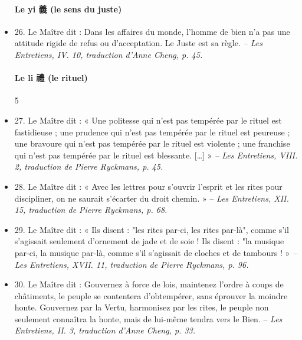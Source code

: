 \begin{itemize}
\paragraph{Le yi 義 (le sens du juste)}  
\item 26. \newline Le Maître dit : Dans les affaires du monde, l’homme de bien n’a pas une attitude rigide de refus ou d’acceptation. Le Juste est sa règle. \textit{\small -- Les Entretiens, IV. 10, traduction d’Anne Cheng, p. 45. } 

\paragraph{Le li 禮 (le rituel)}   
5 
\item 27. \newline Le Maître dit : « Une politesse qui n’est pas tempérée par le rituel est fastidieuse ; une prudence qui n’est pas tempérée par le rituel est peureuse ; une bravoure qui n’est pas tempérée par le rituel est violente ; une franchise qui n’est pas tempérée par le rituel est blessante. […] » \textit{\small -- Les Entretiens, VIII. 2, traduction de Pierre Ryckmans, p. 45.  }
\item 28. \newline Le Maître dit : « Avec les lettres pour s’ouvrir l’esprit et les rites pour discipliner, on ne saurait s’écarter du droit chemin. » -- \textit{\small  Les Entretiens, XII. 15, traduction de Pierre Ryckmans, p. 68.  }
\item 29. \newline Le Maître dit : « Ils disent : "les rites par-ci, les rites par-là", comme s’il s’agissait seulement d’ornement de jade et de soie ! Ils disent : "la musique par-ci, la musique par-là, comme s’il s’agissait de cloches et de tambours ! » \textit{\small -- Les Entretiens, XVII. 11, traduction de Pierre Ryckmans, p. 96.  }
\item 30. \newline Le Maître dit : Gouvernez à force de lois, maintenez l’ordre à coups de châtiments, le peuple se contentera d’obtempérer, sans éprouver la moindre honte. Gouvernez par la Vertu, harmonisez par les rites, le peuple non seulement connaîtra la honte, mais de lui-même tendra vers le Bien.  -- \textit{\small  Les Entretiens, II. 3, traduction d’Anne Cheng, p. 33.  }

\end{itemize}

